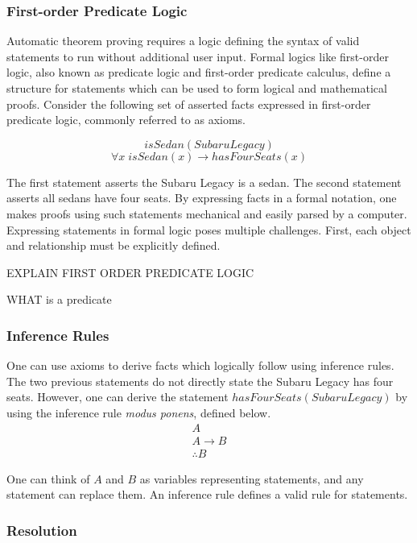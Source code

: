 \documentclass{article}
\begin{document}
\subsubsection{First-order Predicate Logic}

Automatic theorem proving requires a logic defining the syntax of valid statements to run without additional user input. Formal logics like first-order logic, also known as predicate logic and first-order predicate calculus, define a structure for statements which can be used to form logical and mathematical proofs. Consider the following set of asserted facts expressed in first-order predicate logic, commonly referred to as axioms. 

\begin{singlespace}
\[isSedan(Subaru Legacy)\]
\[\forall x \; isSedan(x) \rightarrow hasFourSeats(x)\]
\end{singlespace} 

The first statement asserts the Subaru Legacy is a sedan. The second statement asserts all sedans have four seats. By expressing facts in a formal notation, one makes proofs using such statements mechanical and easily parsed by a computer. Expressing statements in formal logic poses multiple challenges. First, each object and relationship must be explicitly defined.

EXPLAIN FIRST ORDER PREDICATE LOGIC

WHAT is a predicate


\subsubsection{Inference Rules}

One can use axioms to derive facts which logically follow using inference rules. The two previous statements do not directly state the Subaru Legacy has four seats. However, one can derive the statement $hasFourSeats(Subaru Legacy)$ by using the inference rule \textit{modus ponens}, defined below. 
\begin{equation}
\begin{gathered}
A \\
A \rightarrow B \\
\therefore B
\end{gathered}
\end{equation}

One can think of $A$ and $B$ as variables representing statements, and any statement can replace them. An inference rule defines a valid rule for statements. 
\subsubsection{Resolution}
\end{document}
